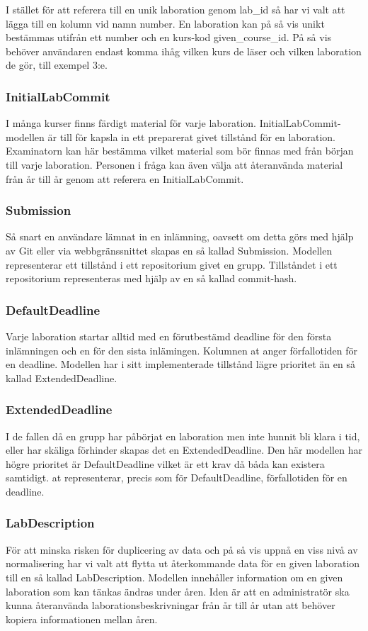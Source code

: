 I stället för att referera till en unik laboration genom lab\_id så har vi valt att lägga till en kolumn vid namn number. En laboration kan på så vis unikt bestämmas utifrån ett number och en kurs-kod given\_course\_id. På så vis behöver användaren endast komma ihåg vilken kurs de läser och vilken laboration de gör, till exempel 3:e.

\subsubsection{InitialLabCommit}
I många kurser finns färdigt material för varje laboration. InitialLabCommit-modellen är till för kapsla in ett preparerat givet tillstånd för en laboration. Examinatorn kan här bestämma vilket material som bör finnas med från början till varje laboration. Personen i fråga kan även välja att återanvända material från år till år genom att referera en InitialLabCommit.

\subsubsection{Submission}
Så snart en användare lämnat in en inlämning, oavsett om detta görs med hjälp av Git eller via webbgränssnittet skapas en så kallad Submission. Modellen representerar ett tillstånd i ett repositorium givet en grupp. Tillståndet i ett repositorium representeras med hjälp av en så kallad commit-hash.

\subsubsection{DefaultDeadline}
Varje laboration startar alltid med en förutbestämd deadline för den första inlämningen och en för den sista inlämingen. Kolumnen at anger förfallotiden för en deadline. Modellen har i sitt implementerade tillstånd lägre prioritet än en så kallad ExtendedDeadline.

\subsubsection{ExtendedDeadline}
I de fallen då en grupp har påbörjat en laboration men inte hunnit bli klara i tid, eller har skäliga förhinder skapas det en ExtendedDeadline. Den här modellen har högre prioritet är DefaultDeadline vilket är ett krav då båda kan existera samtidigt. at representerar, precis som för DefaultDeadline, förfallotiden för en deadline.

\subsubsection{LabDescription}
För att minska risken för duplicering av data och på så vis uppnå en viss nivå av normalisering har vi valt att flytta ut återkommande data för en given laboration till en så kallad LabDescription. Modellen innehåller information om en given laboration som kan tänkas ändras under åren. Iden är att en administratör ska kunna återanvända laborationsbeskrivningar från år till år utan att behöver kopiera informationen mellan åren.

